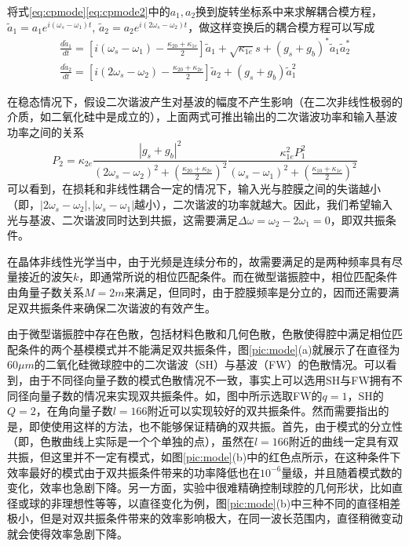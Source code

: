 将式\ref{eq:cpmode}\ref{eq:cpmode2}中的$a_1, a_2$换到旋转坐标系中来求解耦合模方程，$\tilde{a}_1 = a_1e^{i(\omega_s-\omega_1)t}$, $\tilde{a}_2 = a_2e^{i(2\omega_s-\omega_2)t}$，做这样变换后的耦合模方程可以写成
\begin{gather}
\label{eq:cpmoder}
\frac{d\tilde{a}_1}{dt} = [i(\omega_s-\omega_1)-\frac{\kappa_{20}+\kappa_{1e}}{2}]\tilde{a}_1+\sqrt{\kappa_{1e}}s+(g_s+g_b)^*\tilde{a}_1\tilde{a}_2^* \\
\frac{d\tilde{a}_2}{dt} = [i(2\omega_s-\omega_2)-\frac{\kappa_{20}+\kappa_{2e}}{2}]\tilde{a}_2+(g_s+g_b)\tilde{a}_1^2
\label{eq:cpmoder2}
\end{gather}

在稳态情况下，假设二次谐波产生对基波的幅度不产生影响（在二次非线性极弱的介质，如二氧化硅中是成立的），上面两式可推出输出的二次谐波功率和输入基波功率之间的关系
\begin{equation}
P_2 = \kappa_{2e}\frac{|g_s+g_b|^2}{(2\omega_s-\omega_2)^2+(\frac{\kappa_{20}+\kappa_{2e}}{2})^2}\frac{\kappa_{1e}^2P_1^2}{(\omega_s-\omega_1)^2+(\frac{\kappa_{10}+\kappa_{1e}}{2})^2}
\end{equation}
可以看到，在损耗和非线性耦合一定的情况下，输入光与腔膜之间的失谐越小（即，$|2\omega_s-\omega_2|, |\omega_s-\omega_1|$越小），二次谐波的功率就越大。因此，我们希望输入光与基波、二次谐波同时达到共振，这需要满足$\Delta \omega = \omega_2 - 2\omega_1=0$，即双共振条件。

在晶体非线性光学当中，由于光频是连续分布的，故需要满足的是两种频率具有尽量接近的波矢$k$，即通常所说的相位匹配条件。而在微型谐振腔中，相位匹配条件由角量子数关系$M=2m$来满足，但同时，由于腔膜频率是分立的，因而还需要满足双共振条件来确保二次谐波的有效产生。

由于微型谐振腔中存在色散，包括材料色散和几何色散，色散使得腔中满足相位匹配条件的两个基模模式并不能满足双共振条件，图\ref{pic:mode}(a)就展示了在直径为60$\mu m$的二氧化硅微球腔中的二次谐波（SH）与基波（FW）的色散情况。可以看到，由于不同径向量子数的模式色散情况不一致，事实上可以选用SH与FW拥有不同径向量子数的情况来实现双共振条件。如，图中所示选取FW的$q=1$，SH的$Q=2$，在角向量子数$l=166$附近可以实现较好的双共振条件。然而需要指出的是，即使使用这样的方法，也不能够保证精确的双共振。首先，由于模式的分立性（即，色散曲线上实际是一个个单独的点），虽然在$l=166$附近的曲线一定具有双共振，但这里并不一定有模式，如图\ref{pic:mode}(b)中的红色点所示，在这种条件下效率最好的模式由于双共振条件带来的功率降低也在$10^{-6}$量级，并且随着模式数的变化，效率也急剧下降。另一方面，实验中很难精确控制球腔的几何形状，比如直径或球的非理想性等等，以直径变化为例，图\ref{pic:mode}(b)中三种不同的直径相差极小，但是对双共振条件带来的效率影响极大，在同一波长范围内，直径稍微变动就会使得效率急剧下降。

